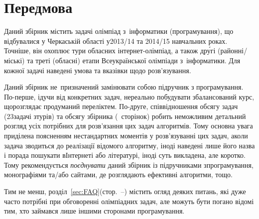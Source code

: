\section{Передмова}

Даний збірник містить задачі олімпіад з~інформатики (програмування), що відбувалися у Черкаській області у\nolinebreak[2] \mbox{2013/14} та \mbox{2014/15} навчальних роках. Точніше, він охоплює тури обласних інтернет-олімпіад, а також др\'{у}гі (районні/\linebreak[1]міські) та треті (обласні) етапи Всеукраїнської олімпіади з~інформатики. Для кожної задачі наведені умова та вказівки щодо розв'язування.

Даний збірник не~призначений замінювати собою підручник з програмування. По-перше, ідучи від конкретних задач, нереально побудувати збалансований курс, що\nolinebreak[2] розглядає продуманий перелік\nolinebreak[2] тем. По-друге, співвідношення обсягу задач (23\nolinebreak[3] задачі з\nolinebreak[3] турів) та обсягу збірника \ifallIdeOneLinksCopiedHere\else(\pageref{LastPage}~сторінок) \fi{}робить немож\-ливим детальний розгляд усіх потрібних для розв'язання цих задач алгоритмів. Тому основна увага приділена поясненням нестандартних моментів у розв'язуванні цих задач, а\nolinebreak[3] коли задача зводиться до реалізації відомого алгоритму, іноді наведені лише його назва і порада пошукати в\nolinebreak[3] Інтернеті або літературі, іноді суть викладена, але коротко. Тому рекомендується \emph{поєднувати} даний збірник із підручниками з\nolinebreak[3] програмування, монографіями \mbox{та/або} сайтами, де розглядають ефективні алгоритми, тощо.

Тим не менш, розділ~\ref{sec:FAQ}\nolinebreak[3] (стор.~\pageref{sec:FAQ}--\nolinebreak[4]\pageref{text:FAQ-end}) містить огляд деяких питань, які дуже часто потрібні при обговоренні олімпіадних задач, але можуть бути погано відомі тим, хто займався лише іншими сторонами програмування.

